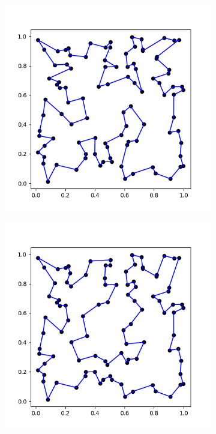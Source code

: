 \documentclass{article}
\begin{document}
\begin{figure}[h]
	\centering
	\begin{subfigure}[t]{0.27\linewidth}
		\centering
		\includegraphics[width = 1.0\linewidth, trim={20 20 30 30}, clip=true]{figures/optimum_2.png}
		\label{fig:comp1el}	
	\end{subfigure}%
	\hspace{0.15\linewidth}
	\begin{subfigure}[t]{0.27\linewidth}
		\centering
		\includegraphics[width = 1.0\linewidth, trim={20 20 30 30}, clip=true]{figures/orig_citiesmin.png}

\end{subfigure}
\end{figure}
\end{document}
